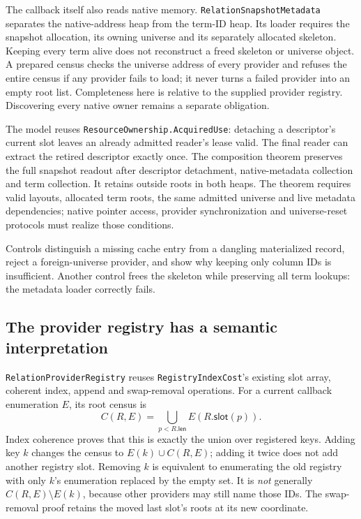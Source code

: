 \documentclass[11pt,a4paper]{article}
\newcommand{\code}[1]{\nolinkurl{#1}}
\begin{document}
The callback itself also reads native memory.
\code{RelationSnapshotMetadata} separates the native-address heap from the
term-ID heap. Its loader requires the snapshot allocation, its owning
universe and its separately allocated skeleton. Keeping every term alive
does not reconstruct a freed skeleton or universe object. A prepared census
checks the universe address of every provider and refuses the entire census
if any provider fails to load; it never turns a failed provider into an
empty root list. Completeness here is relative to the supplied provider
registry. Discovering every native owner remains a separate obligation.

The model reuses \code{ResourceOwnership.AcquiredUse}: detaching a
descriptor's current slot leaves an already admitted reader's lease valid.
The final reader can extract the retired descriptor exactly once. The
composition theorem preserves the full snapshot readout after descriptor
detachment, native-metadata collection and term collection. It retains
outside roots in both heaps. The theorem requires valid layouts, allocated
term roots, the same admitted universe and live metadata dependencies;
native pointer access, provider synchronization and universe-reset protocols
must realize those conditions.

Controls distinguish a missing cache entry from a dangling materialized
record, reject a foreign-universe provider, and show why keeping only column
IDs is insufficient. Another control frees the skeleton while preserving all
term lookups: the metadata loader correctly fails.

\subsection{The provider registry has a semantic interpretation}

\code{RelationProviderRegistry} reuses \code{RegistryIndexCost}'s existing
slot array, coherent index, append and swap-removal operations. For a current
callback enumeration $E$, its root census is
\[
 C(R,E)=\bigcup_{p<R.\mathsf{len}} E(R.\mathsf{slot}(p)).
\]
Index coherence proves that this is exactly the union over registered keys.
Adding key $k$ changes the census to $E(k)\cup C(R,E)$; adding it twice does
not add another registry slot. Removing $k$ is equivalent to enumerating the
old registry with only $k$'s enumeration replaced by the empty set. It is
\emph{not} generally $C(R,E)\setminus E(k)$, because other providers may
still name those IDs. The swap-removal proof retains the moved last slot's
roots at its new coordinate.
\end{document}
